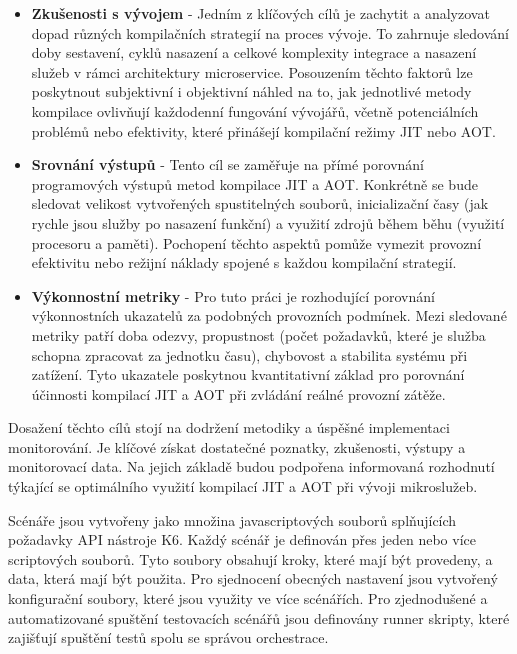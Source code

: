 \begin{itemize}
  \item \textbf{Zkušenosti s vývojem} - Jedním z klíčových cílů je zachytit a analyzovat dopad různých kompilačních strategií na proces vývoje. To zahrnuje sledování doby sestavení, cyklů nasazení a celkové komplexity integrace a nasazení služeb v rámci architektury microservice. Posouzením těchto faktorů lze poskytnout subjektivní i objektivní náhled na to, jak jednotlivé metody kompilace ovlivňují každodenní fungování vývojářů, včetně potenciálních problémů nebo efektivity, které přinášejí kompilační režimy JIT nebo AOT.
  \item \textbf{Srovnání výstupů} - Tento cíl se zaměřuje na přímé porovnání programových výstupů metod kompilace JIT a AOT. Konkrétně se bude sledovat velikost vytvořených spustitelných souborů, inicializační časy (jak rychle jsou služby po nasazení funkční) a využití zdrojů během běhu (využití procesoru a paměti). Pochopení těchto aspektů pomůže vymezit provozní efektivitu nebo režijní náklady spojené s každou kompilační strategií.
  \item \textbf{Výkonnostní metriky} - Pro tuto práci je rozhodující porovnání výkonnostních ukazatelů za podobných provozních podmínek. Mezi sledované metriky patří doba odezvy, propustnost (počet požadavků, které je služba schopna zpracovat za jednotku času), chybovost a stabilita systému při zatížení. Tyto ukazatele poskytnou kvantitativní základ pro porovnání účinnosti kompilací JIT a AOT při zvládání reálné provozní zátěže.
\end{itemize}

Dosažení těchto cílů stojí na dodržení metodiky a úspěšné implementaci monitorování. Je klíčové získat dostatečné poznatky, zkušenosti, výstupy a monitorovací data. Na jejich základě budou podpořena informovaná rozhodnutí týkající se optimálního využití kompilací JIT a AOT při vývoji mikroslužeb.


Scénáře jsou vytvořeny jako množina javascriptových souborů splňujících požadavky API nástroje K6. Každý scénář je definován přes jeden nebo více scriptových souborů. Tyto soubory obsahují kroky, které mají být provedeny, a data, která mají být použita. Pro sjednocení obecných nastavení jsou vytvořený konfigurační soubory, které jsou využity ve více scénářích. Pro zjednodušené a automatizované spuštění testovacích scénářů jsou definovány runner skripty, které zajišťují spuštění testů spolu se správou orchestrace.

